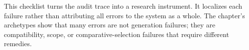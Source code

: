 This checklist turns the audit trace into a research instrument. It localizes each failure rather than attributing all errors to the system as a whole. The chapter's archetypes show that many errors are not generation failures; they are compatibility, scope, or comparative-selection failures that require different remedies.
